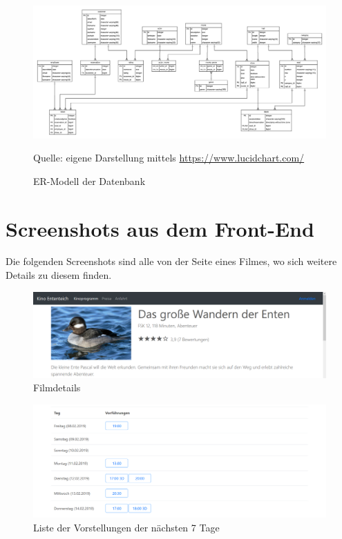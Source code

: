 \begin{figure}
	\centering
	\includegraphics[keepaspectratio, width=\textwidth, height=\textheight]{img/ER-Modell}
	\captionsetup{format=hang}
	\caption{\acs{ER-Modell} der Datenbank}
	\small Quelle: eigene Darstellung mittels \url{https://www.lucidchart.com/}
	\label{fig:Anhang_ER-Modell}
\end{figure}

\chapter{Screenshots aus dem Front-End}
Die folgenden Screenshots sind alle von der Seite eines Filmes, wo sich weitere Details zu diesem finden.

\begin{figure}[ht]
	\centering
	\includegraphics[width=\textwidth]{img/screenshots/film02a}
	\captionsetup{format=hang}
	\caption{Filmdetails}
	\label{fig:film02a}
\end{figure}

\begin{figure}[ht]
	\centering
	\includegraphics[width=\textwidth]{img/screenshots/film03}
	\captionsetup{format=hang}
	\caption{Liste der Vorstellungen der nächsten 7 Tage}
	\label{fig:film03}
\end{figure}

